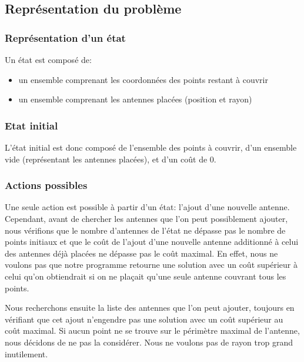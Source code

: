 \documentclass[12pt]{article}
\begin{document}
\subsection{Représentation du problème}

\subsubsection{Représentation d'un état}
Un état est composé de:
\begin{itemize}
	\item un ensemble comprenant les coordonnées des points restant à couvrir
	\item un ensemble comprenant les antennes placées (position et rayon)
\end{itemize}

\subsubsection{Etat initial}
L'état initial est donc composé de l'ensemble des points à couvrir, d'un ensemble vide (représentant les antennes placées), et d'un coût de 0.

\subsubsection{Actions possibles}
Une seule action est possible à partir d'un état: l'ajout d'une nouvelle antenne.
Cependant, avant de chercher les antennes que l'on peut possiblement ajouter, nous vérifions que le nombre d'antennes de l'état ne dépasse pas le nombre de points initiaux et que le coût de l'ajout d'une nouvelle antenne additionné à celui des antennes déjà placées
ne dépasse pas le coût maximal. En effet, nous ne voulons pas que notre programme retourne une solution avec un coût supérieur à celui qu'on obtiendrait si on ne plaçait qu'une seule antenne couvrant tous les points.

Nous recherchons ensuite la liste des antennes que l'on peut ajouter, toujours en vérifiant que cet ajout n'engendre pas une solution avec un coût supérieur au coût maximal. Si aucun point ne se trouve sur le périmètre maximal de l'antenne, nous décidons de ne pas la considérer. Nous ne voulons pas de rayon trop grand inutilement.
\end{document}
